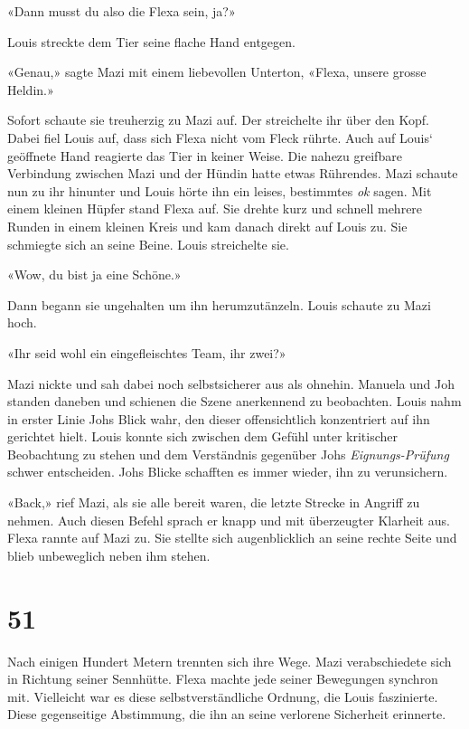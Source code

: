 «Dann musst du also die Flexa sein, ja?»

Louis streckte dem Tier seine flache Hand entgegen.

«Genau,» sagte Mazi mit einem liebevollen Unterton, «Flexa, unsere
grosse Heldin.»

Sofort schaute sie treuherzig zu Mazi auf. Der streichelte ihr über den
Kopf. Dabei fiel Louis auf, dass sich Flexa nicht vom Fleck rührte. Auch
auf Louis` geöffnete Hand reagierte das Tier in keiner Weise. Die nahezu
greifbare Verbindung zwischen Mazi und der Hündin hatte etwas Rührendes.
Mazi schaute nun zu ihr hinunter und Louis hörte ihn ein leises,
bestimmtes \emph{ok} sagen. Mit einem kleinen Hüpfer stand Flexa auf.
Sie drehte kurz und schnell mehrere Runden in einem kleinen Kreis und
kam danach direkt auf Louis zu. Sie schmiegte sich an seine Beine. Louis
streichelte sie.

«Wow, du bist ja eine Schöne.»

Dann begann sie ungehalten um ihn herumzutänzeln. Louis schaute zu Mazi
hoch.

«Ihr seid wohl ein eingefleischtes Team, ihr zwei?»

Mazi nickte und sah dabei noch selbstsicherer aus als ohnehin. Manuela
und Joh standen daneben und schienen die Szene anerkennend zu
beobachten. Louis nahm in erster Linie Johs Blick wahr, den dieser
offensichtlich konzentriert auf ihn gerichtet hielt. Louis konnte sich
zwischen dem Gefühl unter kritischer Beobachtung zu stehen und dem
Verständnis gegenüber Johs \emph{Eignungs-Prüfung} schwer entscheiden.
Johs Blicke schafften es immer wieder, ihn zu verunsichern.

«Back,» rief Mazi, als sie alle bereit waren, die letzte Strecke in
Angriff zu nehmen. Auch diesen Befehl sprach er knapp und mit
überzeugter Klarheit aus. Flexa rannte auf Mazi zu. Sie stellte sich
augenblicklich an seine rechte Seite und blieb unbeweglich neben ihm
stehen.

\chapter{51}\label{section-51}

Nach einigen Hundert Metern trennten sich ihre Wege. Mazi verabschiedete
sich in Richtung seiner Sennhütte. Flexa machte jede seiner Bewegungen
synchron mit. Vielleicht war es diese selbstverständliche Ordnung, die
Louis faszinierte. Diese gegenseitige Abstimmung, die ihn an seine
verlorene Sicherheit erinnerte.

